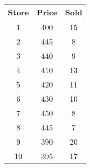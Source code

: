 \begin{tabular}{ccc}  \toprule
Store & Price & Sold \\\midrule
1     & 400   & 15   \\
2     & 445   & 8    \\
3     & 440   & 9    \\
4     & 410   & 13   \\
5     & 420   & 11   \\
6     & 430   & 10   \\
7     & 450   & 8    \\
8     & 445   & 7    \\
9     & 390   & 20   \\
10    & 395   & 17   \\\bottomrule
\end{tabular}
